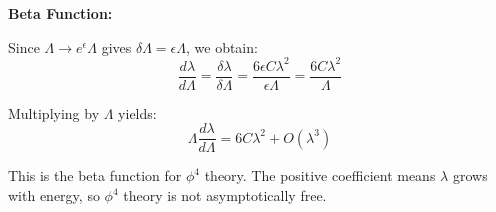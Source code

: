 \documentclass[12pt]{article}
\begin{document}
\textbf{Beta Function:}

Since $\Lambda \to e^\epsilon\Lambda$ gives $\delta\Lambda = \epsilon\Lambda$, we obtain:
\begin{equation}
\frac{d\lambda}{d\Lambda} = \frac{\delta\lambda}{\delta\Lambda} = \frac{6\epsilon C\lambda^2}{\epsilon\Lambda} = \frac{6C\lambda^2}{\Lambda}
\end{equation}

Multiplying by $\Lambda$ yields:
\begin{equation}
\Lambda \frac{d\lambda}{d\Lambda} = 6C\lambda^2 + O(\lambda^3)
\end{equation}

This is the beta function for $\phi^4$ theory. The positive coefficient means $\lambda$ grows with energy, so $\phi^4$ theory is not asymptotically free.
\end{document}
